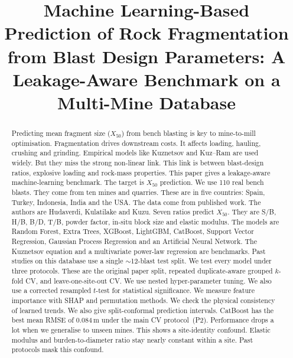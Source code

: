 \documentclass[conference]{IEEEtran}
\begin{document}
\title{Machine Learning-Based Prediction of Rock Fragmentation from Blast
Design Parameters: A Leakage-Aware Benchmark on a Multi-Mine Database}

\author{
}

\maketitle

\begin{abstract}
Predicting mean fragment size ($X_{50}$) from bench blasting is key to mine-to-mill optimisation. Fragmentation drives downstream costs. It affects loading, hauling, crushing and grinding. Empirical models like Kuznetsov and Kuz--Ram are used widely. But they miss the strong non-linear link. This link is between blast-design ratios, explosive loading and rock-mass properties. This paper gives a leakage-aware machine-learning benchmark. The target is $X_{50}$ prediction. We use 110 real bench blasts. They come from ten mines and quarries. These are in five countries: Spain, Turkey, Indonesia, India and the USA. The data come from published work. The authors are Hudaverdi, Kulatilake and Kuzu. Seven ratios predict $X_{50}$. They are S/B, H/B, B/D, T/B, powder factor, in-situ block size and elastic modulus. The models are Random Forest, Extra Trees, XGBoost, LightGBM, CatBoost, Support Vector Regression, Gaussian Process Regression and an Artificial Neural Network. The Kuznetsov equation and a multivariate power-law regression are benchmarks. Past studies on this database use a single $\sim$12-blast test split. We test every model under three protocols. These are the original paper split, repeated duplicate-aware grouped $k$-fold CV, and leave-one-site-out CV. We use nested hyper-parameter tuning. We also use a corrected resampled $t$-test for statistical significance. We measure feature importance with SHAP and permutation methods. We check the physical consistency of learned trends. We also give split-conformal prediction intervals. CatBoost has the best mean RMSE of 0.084\,m under the main CV protocol~(P2). Performance drops a lot when we generalise to unseen mines. This shows a site-identity confound. Elastic modulus and burden-to-diameter ratio stay nearly constant within a site. Past protocols mask this confound.
\end{abstract}
\end{document}
